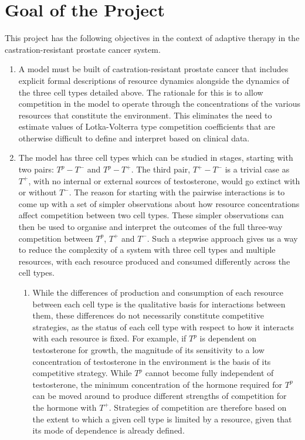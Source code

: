 \section{Goal of the Project}
This project has the following objectives in the context of adaptive therapy in the castration-resistant prostate cancer system.
\begin{enumerate}
  \item A model must be built of castration-resistant prostate cancer that includes explicit formal descriptions of resource dynamics alongside the dynamics of the three cell types detailed above. The rationale for this is to allow competition in the model to operate through the concentrations of the various resources that constitute the environment. This eliminates the need to estimate values of Lotka-Volterra type competition coefficients that are otherwise difficult to define and interpret based on clinical data.
  \item The model has three cell types which can be studied in stages, starting with two pairs: $T^p-T^-$ and $T^p-T^+$. The third pair, $T^+-T^-$ is a trivial case as $T^+$, with no internal or external sources of testosterone, would go extinct with or without $T^-$. The reason for starting with the pairwise interactions is to come up with a set of simpler observations about how resource concentrations affect competition between two cell types. These simpler observations can then be used to organise and interpret the outcomes of the full three-way competition between $T^p$, $T^+$ and $T^-$. Such a stepwise approach gives us a way to reduce the complexity of a system with three cell types and multiple resources, with each resource produced and consumed differently across the cell types.
  \begin{enumerate}
    \item While the differences of production and consumption of each resource between each cell type is the qualitative basis for interactions between them, these differences do not necessarily constitute competitive strategies, as the status of each cell type with respect to how it interacts with each resource is fixed. For example, if $T^p$ is dependent on testosterone for growth, the magnitude of its sensitivity to a low concentration of testosterone in the environment is the basis of its competitive strategy. While $T^p$ cannot become fully independent of testosterone, the minimum concentration of the hormone required for $T^p$ can be moved around to produce different strengths of competition for the hormone with $T^+$. Strategies of competition are therefore based on the extent to which a given cell type is limited by a resource, given that its mode of dependence is already defined.

\end{enumerate}
\end{enumerate}
